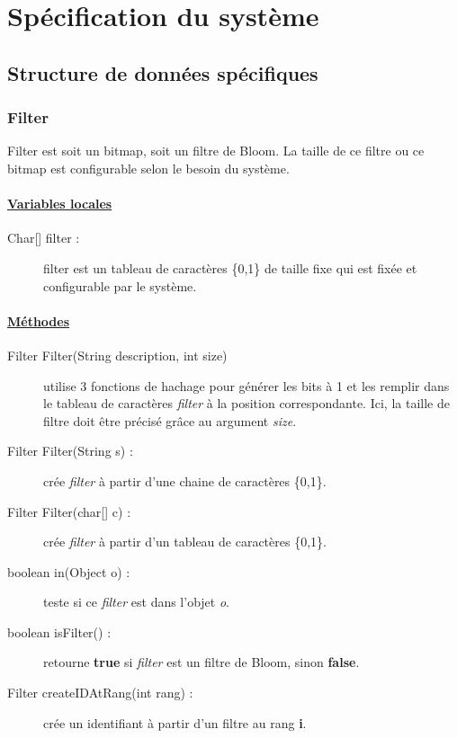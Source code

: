 \documentclass[a4paper,11pt]{report}
\begin{document}
\chapter{Spécification du système}
\section{Structure de données spécifiques}

\subsection{Filter}
	Filter est soit un bitmap, soit un filtre de Bloom. La taille de ce filtre ou ce bitmap est configurable selon le besoin du système. 
	
\subsubsection{\underline{Variables locales}}
	\begin{description}
		\item[{Char[] filter :}] filter est un tableau de caractères \{0,1\} de taille fixe qui est fixée et configurable par le système.
	\end{description}
	
\subsubsection{\underline{Méthodes}}
	\begin{description}
		\item[Filter Filter(String description, int size)] utilise 3 fonctions de hachage pour générer les bits à 1 et les remplir dans le tableau de caractères \textit{filter} à la position correspondante. Ici, la taille de filtre doit être précisé grâce au argument \textit{size}.
		\item[Filter Filter(String s) :] crée \textit{filter} à partir d'une chaine de caractères \{0,1\}. 
		\item[Filter Filter(char{[]} c) :] crée \textit{filter} à partir d'un tableau de caractères \{0,1\}. 
		\item[boolean in(Object o) :] teste si ce \textit{filter} est dans l'objet \textit{o}.
		\item[boolean isFilter() :] retourne \textbf{true} si \textit{filter} est un filtre de Bloom, sinon \textbf{false}.
		\item[Filter createIDAtRang(int rang) :] crée un identifiant à partir d'un filtre au rang \textbf{i}.
	\end{description}
	
\end{document}
